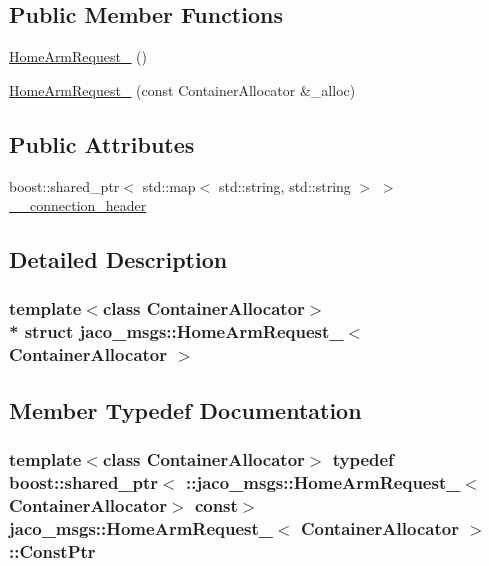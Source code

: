 \subsection*{Public Member Functions}
\begin{DoxyCompactItemize}
\item 
\hyperlink{structjaco__msgs_1_1HomeArmRequest___a0ea11d301c171d7aff6a5419372e4387}{Home\+Arm\+Request\+\_\+} ()
\item 
\hyperlink{structjaco__msgs_1_1HomeArmRequest___aef61dfce31cf19351eef6a2ebbaeba6f}{Home\+Arm\+Request\+\_\+} (const Container\+Allocator \&\+\_\+alloc)
\end{DoxyCompactItemize}
\subsection*{Public Attributes}
\begin{DoxyCompactItemize}
\item 
boost\+::shared\+\_\+ptr$<$ std\+::map$<$ std\+::string, std\+::string $>$ $>$ \hyperlink{structjaco__msgs_1_1HomeArmRequest___aabb172cf2436ef9505917263af8b9fd3}{\+\_\+\+\_\+connection\+\_\+header}
\end{DoxyCompactItemize}


\subsection{Detailed Description}
\subsubsection*{template$<$class Container\+Allocator$>$\\*
struct jaco\+\_\+msgs\+::\+Home\+Arm\+Request\+\_\+$<$ Container\+Allocator $>$}



\subsection{Member Typedef Documentation}
\subsubsection[{\texorpdfstring{Const\+Ptr}{ConstPtr}}]{\setlength{\rightskip}{0pt plus 5cm}template$<$class Container\+Allocator$>$ typedef boost\+::shared\+\_\+ptr$<$ \+::{\bf jaco\+\_\+msgs\+::\+Home\+Arm\+Request\+\_\+}$<$Container\+Allocator$>$ const$>$ {\bf jaco\+\_\+msgs\+::\+Home\+Arm\+Request\+\_\+}$<$ Container\+Allocator $>$\+::{\bf Const\+Ptr}}\hypertarget{structjaco__msgs_1_1HomeArmRequest___aeb08171e814003f8aee8c2417a98ad82}{}\label{structjaco__msgs_1_1HomeArmRequest___aeb08171e814003f8aee8c2417a98ad82}
